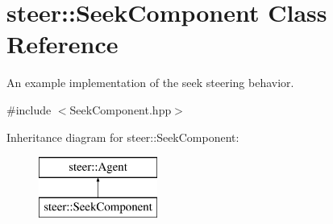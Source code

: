\hypertarget{classsteer_1_1_seek_component}{\section{steer\-:\-:Seek\-Component Class Reference}
\label{classsteer_1_1_seek_component}
}


An example implementation of the seek steering behavior.  




{\ttfamily \#include $<$Seek\-Component.\-hpp$>$}

Inheritance diagram for steer\-:\-:Seek\-Component\-:\begin{figure}[H]
\begin{center}
\leavevmode
\includegraphics[height=2.000000cm]{classsteer_1_1_seek_component}
\end{center}
\end{figure}
